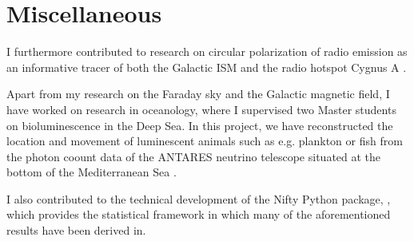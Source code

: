 \section{Miscellaneous}
I furthermore contributed to research on circular polarization of radio emission as an informative tracer of both the Galactic ISM \citep{2017Ensslin} and the radio hotspot Cygnus A \citep{2019Ensslin}.  \par
Apart from my research on the Faraday sky and the Galactic magnetic field, I have worked on research in oceanology, where I supervised two Master students on bioluminescence in the Deep Sea.
In this project, we have reconstructed the location and movement of luminescent animals such as e.g. plankton or fish from the photon coount data of the ANTARES neutrino telescope situated at the bottom of the Mediterranean Sea \citep{2021Reeb}. \par
I also contributed to the technical development of the Nifty Python package, \citep{2017Steininger_update, 2019NIFTY}, which provides the statistical framework in which many of the aforementioned results have been derived in.
